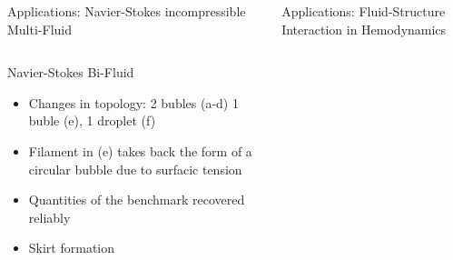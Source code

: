 \documentclass[final,utf8,,hyperref={pdfpagelabels=false}]{beamer}
\begin{document}
\begin{frame}[containsverbatim]{}
\begin{columns}[t]
\begin{block}{Applications: Navier-Stokes incompressible Multi-Fluid}
\begin{columns}[t]
\begin{column}{.52\textwidth}
\begin{block}{Navier-Stokes Bi-Fluid}
\begin{itemize}
            \item Changes in topology: 2 bubles (a-d) 1 buble (e), 1 droplet (f)
            \item Filament in (e) takes back the form of a circular bubble due
              to surfacic tension

            \item Quantities of the benchmark recovered reliably
            \item Skirt formation
            \end{itemize}
          \end{block}
        \end{column}
      \end{columns}

  \end{block}

  \begin{block}{Applications: Fluid-Structure Interaction in Hemodynamics}
    

\end{block}
\end{columns}
\end{frame}
\end{document}
